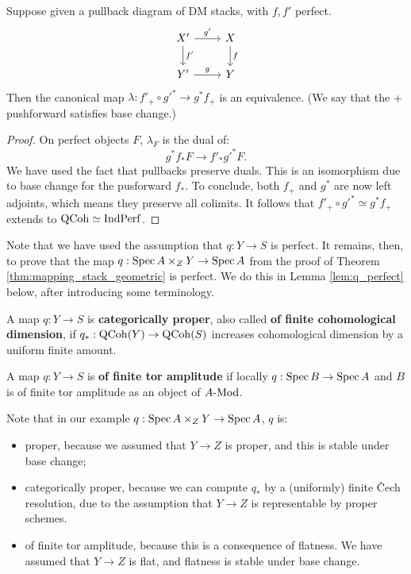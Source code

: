 \begin{lem}
\label{lem:q+_base}
Suppose given a pullback diagram of DM stacks,  with $f, f'$ perfect.
\[
\begin{tikzcd}
X'\arrow{r}{g'}\arrow{d}{f'} & X\arrow{d}{f} \\ Y' \arrow{r}{g} & Y
\end{tikzcd}
\]
Then the canonical map $\lambda: f'_+ \circ g'^* \to g^* f_+$ is an equivalence. 
(We say that the + pushforward satisfies base change.)
\end{lem}
\begin{proof}
On perfect objects $F$, $\lambda_F$ is the dual of:
\[	g^*f_* F \to f'_*g'^* F.	\]
We have used the fact that pullbacks preserve duals. This is an isomorphism due to base change for the pusforward $f_*$.
To conclude, both $f_+$ and $g^*$ are now left adjoints, which means they preserve all colimits. It follows that
$f'_+ \circ g'^* \simeq g^* f_+$ extends to $\mathrm{QCoh} \simeq \mathrm{Ind} \mathrm{Perf}$.
\end{proof}

Note that we have used the assumption that $q: Y \to S$ is perfect. It remains, then, to prove that the map $q : \operatorname{Spec} A \times_Z Y
\to \operatorname{Spec} A$ from the proof of Theorem \ref{thm:mapping_stack_geometric} is perfect. We do this in Lemma \ref{lem:q_perfect}
below, after introducing some terminology.

\begin{defin}
A map $q:Y \to S$ is \textbf{categorically proper}, also called \textbf{of finite cohomological dimension}, if
$q_* : \mathrm{QCoh}(Y) \to \mathrm{QCoh}(S)$ increases cohomological dimension by a uniform finite amount.
\end{defin}

\begin{defin}
A map $q:Y \to S$ is \textbf{of finite tor amplitude} if locally $q:\operatorname{Spec} B \to \operatorname{Spec} A$ and $B$ is of finite tor amplitude
as an object of $A\textrm{-}\mathrm{Mod}$.
\end{defin}

Note that in our example $q: \operatorname{Spec} A \times_Z Y \to \operatorname{Spec} A$, $q$ is:
\begin{itemize}
\item proper, because we assumed that $Y \to Z$ is proper, and this is stable under base change;
\item categorically proper, because we can compute $q_*$ by a (uniformly) finite \v{C}ech resolution, due to the assumption
that $Y \to Z$ is representable by proper schemes.
\item of finite tor amplitude, because this is a consequence of flatness. We have assumed that $Y\to Z$ is flat,
and flatness is stable under base change.
\end{itemize}

